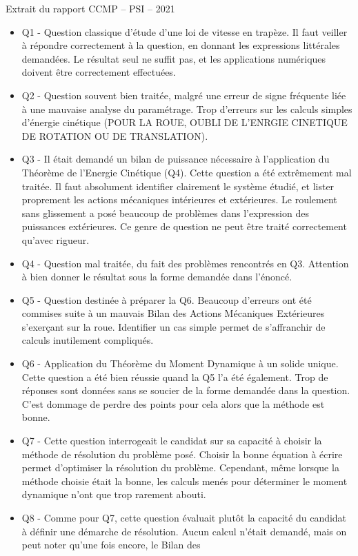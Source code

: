 \documentclass[10pt,fleqn]{article} %
\begin{document}
Extrait du rapport CCMP -- PSI -- 2021
\begin{itemize}
\item Q1 - Question classique d’étude d’une loi de vitesse en trapèze. Il faut veiller à répondre correctement
à la question, en donnant les expressions littérales demandées. Le résultat seul ne suffit pas, et les
applications numériques doivent être correctement effectuées.
\item Q2 - Question souvent bien traitée, malgré une erreur de signe fréquente liée à une mauvaise analyse
du paramétrage. Trop d’erreurs sur les calculs simples d’énergie cinétique (POUR LA ROUE, OUBLI DE L'ENRGIE CINETIQUE DE ROTATION OU DE TRANSLATION).
\item Q3 - Il était demandé un bilan de puissance nécessaire à l’application du Théorème de l’Energie
Cinétique (Q4). Cette question a été extrêmement mal traitée. Il faut absolument identifier clairement
le système étudié, et lister proprement les actions mécaniques intérieures et extérieures. Le roulement
sans glissement a posé beaucoup de problèmes dans l’expression des puissances extérieures. Ce genre
de question ne peut être traité correctement qu’avec rigueur. 
\item Q4 - Question mal traitée, du fait des problèmes rencontrés en Q3. Attention à bien donner le résultat
sous la forme demandée dans l’énoncé.
\item Q5 - Question destinée à préparer la Q6. Beaucoup d’erreurs ont été commises suite à un mauvais
Bilan des Actions Mécaniques Extérieures s’exerçant sur la roue. Identifier un cas simple permet de
s’affranchir de calculs inutilement compliqués.
\item Q6 - Application du Théorème du Moment Dynamique à un solide unique. Cette question a été bien
réussie quand la Q5 l’a été également. Trop de réponses sont données sans se soucier de la forme
demandée dans la question. C’est dommage de perdre des points pour cela alors que la méthode est
bonne.
\item Q7 - Cette question interrogeait le candidat sur sa capacité à choisir la méthode de résolution du
problème posé. Choisir la bonne équation à écrire permet d’optimiser la résolution du problème.
Cependant, même lorsque la méthode choisie était la bonne, les calculs menés pour déterminer le
moment dynamique n’ont que trop rarement abouti.
\item Q8 - Comme pour Q7, cette question évaluait plutôt la capacité du candidat à définir une démarche
de résolution. Aucun calcul n’était demandé, mais on peut noter qu’une fois encore, le Bilan des

\end{itemize}
\end{document}
